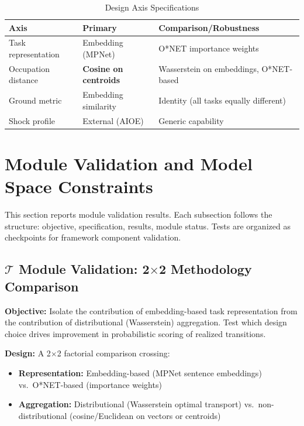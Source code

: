 \documentclass[12pt]{article}
\begin{document}
\begin{table}[h!]
\centering
\caption{Design Axis Specifications}
\label{tab:design-axes}
\begin{tabular}{lll}
\toprule
\textbf{Axis} & \textbf{Primary} & \textbf{Comparison/Robustness} \\
\midrule
Task representation & Embedding (MPNet) & O*NET importance weights \\
Occupation distance & \textbf{Cosine on centroids} & Wasserstein on embeddings, O*NET-based \\
Ground metric & Embedding similarity & Identity (all tasks equally different) \\
Shock profile & External (AIOE) & Generic capability \\
\bottomrule
\end{tabular}
\end{table}



\section{Module Validation and Model Space Constraints}
\label{sec:validation}


This section reports module validation results. Each subsection follows the structure: objective, specification, results, module status. Tests are organized as checkpoints for framework component validation.


\subsection{$\mathcal{T}$ Module Validation: 2$\times$2 Methodology Comparison}
\label{subsec:geometry-comparison}


\textbf{Objective:} Isolate the contribution of embedding-based task representation from the contribution of distributional (Wasserstein) aggregation. Test which design choice drives improvement in probabilistic scoring of realized transitions.

\textbf{Design:} A 2$\times$2 factorial comparison crossing:
\begin{itemize}
    \item \textbf{Representation:} Embedding-based (MPNet sentence embeddings) vs.\ O*NET-based (importance weights)
    \item \textbf{Aggregation:} Distributional (Wasserstein optimal transport) vs.\ non-distributional (cosine/Euclidean on vectors or centroids)
\end{itemize}
\end{document}
